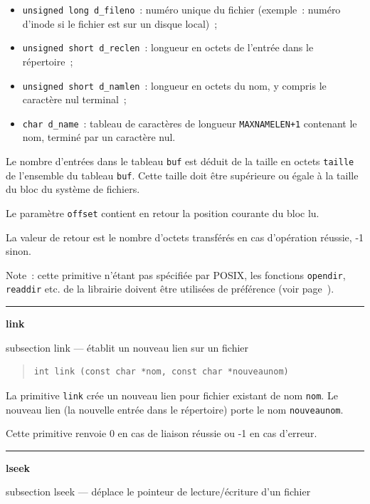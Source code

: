 \documentclass [twoside] {report}
\newcommand {\primitive} [1]
    {
	\phantomsection
	{\large \textbf {#1}}
	\addcontentsline {toc} {subsection} {#1}
    }
\newcommand {\separation}
    {
	\vspace {5mm}
	\nopagebreak
	\hrule
    }
\begin{document}
\begin {itemize}
    \item \texttt {unsigned long d\_fileno}~:  numéro unique du fichier
	(exemple~:  numéro d'inode si le fichier est sur un disque
	local)~;
    \item \texttt {unsigned short d\_reclen}~: longueur en octets de l'entrée
	dans le répertoire~;
    \item \texttt {unsigned short d\_namlen}~: longueur en octets du nom, y
	compris le caractère nul terminal~;
    \item \texttt {char d\_name}~: tableau de caractères de longueur
	\texttt {MAXNAMELEN+1} contenant le nom, terminé par un
	caractère nul.

\end {itemize}

Le nombre d'entrées dans le tableau \texttt {buf} est déduit de la taille en
octets \texttt {taille} de l'ensemble du tableau \texttt {buf}. Cette taille
doit être supérieure ou égale à la taille du bloc du système de
fichiers.

Le paramètre \texttt {offset} contient en retour la position courante du bloc
lu.

La valeur de retour est le nombre d'octets transférés en cas d'opération
réussie, -1 sinon.

Note~:  cette primitive n'étant pas spécifiée par POSIX, les
fonctions \texttt {opendir}, \texttt {readdir} etc.  de la librairie doivent
être utilisées de préférence (voir page~\pageref {opendir}).


\separation
\primitive {link} --- établit un nouveau lien sur un fichier

\begin {quote}
\begin {verbatim}
int link (const char *nom, const char *nouveaunom)
\end{verbatim}
\end {quote}

La primitive \texttt {link} crée un nouveau lien pour
fichier existant de nom \texttt {nom}. Le nouveau lien
(la nouvelle entrée dans le répertoire) porte
le nom \texttt {nouveaunom}.

Cette primitive renvoie 0 en cas de liaison
réussie ou -1 en cas d'erreur.




\separation
\primitive {lseek} --- déplace le pointeur de lecture/écriture d'un fichier
\end{document}
